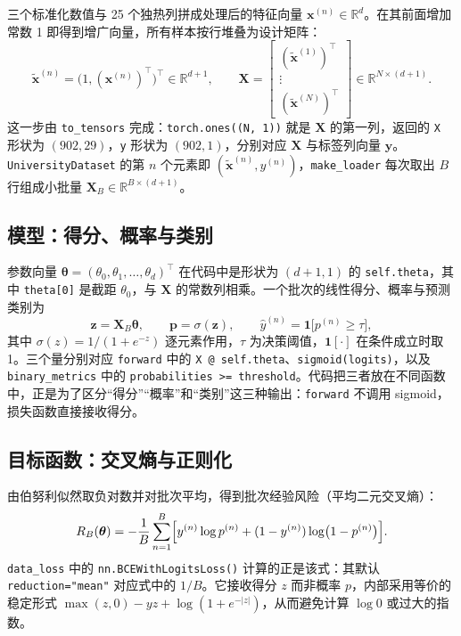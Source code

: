 \documentclass[UTF8,a4paper,11pt,fontset=fandol]{ctexart}
\begin{document}
三个标准化数值与 25 个独热列拼成处理后的特征向量 $\mathbf x^{(n)}\in\mathbb R^{d}$。在其前面增加常数 1 即得到增广向量，所有样本按行堆叠为设计矩阵：
\begin{equation}
\tilde{\mathbf x}^{(n)}=\bigl(1,(\mathbf x^{(n)})^\top\bigr)^\top\in\mathbb R^{d+1},\qquad
\mathbf X=\begin{bmatrix}(\tilde{\mathbf x}^{(1)})^\top\\\vdots\\(\tilde{\mathbf x}^{(N)})^\top\end{bmatrix}\in\mathbb R^{N\times(d+1)}.
\end{equation}
这一步由 \texttt{to\_tensors} 完成：\texttt{torch.ones((N, 1))} 就是 $\mathbf X$ 的第一列，返回的 \texttt{X} 形状为 $(902,29)$，\texttt{y} 形状为 $(902,1)$，分别对应 $\mathbf X$ 与标签列向量 $\mathbf y$。\texttt{UniversityDataset} 的第 $n$ 个元素即 $(\tilde{\mathbf x}^{(n)},y^{(n)})$，\texttt{make\_loader} 每次取出 $B$ 行组成小批量 $\mathbf X_B\in\mathbb R^{B\times(d+1)}$。
\subsection{模型：得分、概率与类别}
参数向量 $\boldsymbol\theta=(\theta_0,\theta_1,\ldots,\theta_d)^\top$ 在代码中是形状为 $(d+1,1)$ 的 \texttt{self.theta}，其中 \texttt{theta[0]} 是截距 $\theta_0$，与 $\mathbf X$ 的常数列相乘。一个批次的线性得分、概率与预测类别为
\begin{equation}
\mathbf z=\mathbf X_B\boldsymbol\theta,\qquad
\mathbf p=\sigma(\mathbf z),\qquad
\hat y^{(n)}=\mathbf 1\bigl[p^{(n)}\ge\tau\bigr],
\end{equation}
其中 $\sigma(z)=1/(1+e^{-z})$ 逐元素作用，$\tau$ 为决策阈值，$\mathbf 1[\cdot]$ 在条件成立时取 1。三个量分别对应 \texttt{forward} 中的 \texttt{X @ self.theta}、\texttt{sigmoid(logits)}，以及 \texttt{binary\_metrics} 中的 \texttt{probabilities >= threshold}。代码把三者放在不同函数中，正是为了区分“得分”“概率”和“类别”这三种输出：\texttt{forward} 不调用 sigmoid，损失函数直接接收得分。
\subsection{目标函数：交叉熵与正则化}
由伯努利似然取负对数并对批次平均，得到批次经验风险（平均二元交叉熵）：
\begin{equation}
R_B(\boldsymbol\theta)=-\frac1B\sum_{n=1}^{B}\Bigl[y^{(n)}\log p^{(n)}+(1-y^{(n)})\log\bigl(1-p^{(n)}\bigr)\Bigr].
\end{equation}
\texttt{data\_loss} 中的 \texttt{nn.BCEWithLogitsLoss()} 计算的正是该式：其默认 \texttt{reduction="mean"} 对应式中的 $1/B$。它接收得分 $z$ 而非概率 $p$，内部采用等价的稳定形式 $\max(z,0)-yz+\log(1+e^{-|z|})$，从而避免计算 $\log 0$ 或过大的指数。
\end{document}
